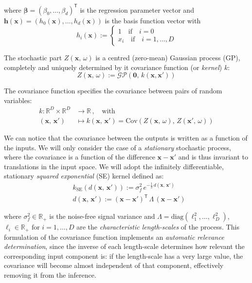 \noindent
where $\boldsymbol{\beta} = (\beta_0,\dots,\beta_d)^\mathsf{T}$ is the regression parameter vector and $\mathbf{h}(\mathbf{x}) = (h_0(\mathbf{x}),\dots,h_d(\mathbf{x}))$ is the basis function vector with
%
\begin{equation}
    h_i(\mathbf{x}):=\begin{cases}
        1 \quad\text{if}\quad i = 0 \\
        x_i \quad\text{if}\quad i=1,\dots,D
    \end{cases}
\end{equation}

The stochastic part $Z(\mathbf{x},\,\omega)$ is a centred (zero-mean) Gaussian process (\acs{GP}), completely and uniquely determined by it covariance function (or \textit{kernel}) $k$:
%
\begin{equation}
    Z(\mathbf{x},\,\omega):= \mathcal{GP}(\mathbf{0},\,k(\mathbf{x},\mathbf{x'}))
\end{equation}

\noindent
The covariance function specifies the covariance between pairs of random variables:
%
\begin{align}
    k\colon\mathbb{R}^{D}\times\mathbb{R}^{D}&\to\mathbb{R}\,,\quad\text{with} \\
    (\mathbf{x},\,\mathbf{x}')&\mapsto k(\mathbf{x},\,\mathbf{x}') = \text{Cov}(Z(\mathbf{x},\,\omega),\, Z(\mathbf{x}',\,\omega))
\end{align}

\noindent
We can notice that the covariance between the outputs is written as a function of the inputs. We will only consider the case of a \textit{stationary} stochastic process, where the covariance is a function of the difference $\mathbf{x}-\mathbf{x}'$ and is thus invariant to translations in the input space. We will adopt the infinitely differentiable, stationary \textit{squared exponential} (\acs{SE}) kernel defined as:
%
\begin{align}
     &k_{\text{SE}}(d(\mathbf{x},\,\mathbf{x}')) := \sigma_f^2\, e^{-\frac{1}{2}\,d(\mathbf{x},\,\mathbf{x}')} \\
     &d(\mathbf{x},\,\mathbf{x}') := (\mathbf{x}-\mathbf{x}')^\mathsf{T}\,\Lambda\,(\mathbf{x}-\mathbf{x}')
\end{align}

\noindent
where $\sigma_f^2\in\mathbb{R}_{+}$ is the noise-free signal variance and $\Lambda=\text{diag}(\ell_1^2,\dots,\ell_D^2)$, $\ell_i\in\mathbb{R}_{+}\,\,\text{for}\,\,i=1,\dots,D$ are the \textit{characteristic length-scales} of the process. This formulation of the covariance function implements an \textit{automatic relevance determination}, since the inverse of each length-scale determines how relevant the corresponding input component is: if the length-scale has a very large value, the covariance will become almost independent of that component, effectively removing it from the inference.

